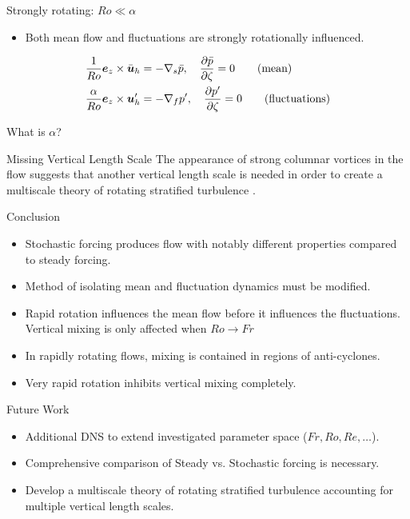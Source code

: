 \documentclass{beamer}
\begin{document}
\begin{frame}{Strongly rotating: $Ro \ll \alpha$}

    \begin{itemize}
        \item Both mean flow and fluctuations are strongly rotationally influenced.
    \end{itemize}

    \begin{align*}
        \frac{1}{Ro}\boldsymbol{e}_z \times \bar{\boldsymbol{u}}_h &= -\nabla_s \bar{p}, \quad \frac{\partial \bar{p}}{\partial \zeta} = 0 \tag{mean}\\
        \frac{\alpha}{Ro}\boldsymbol{e}_z \times \boldsymbol{u}'_h &= -\nabla_f p', \quad \frac{\partial p'}{\partial \zeta} = 0 \tag{fluctuations}
    \end{align*} 

    What is $\alpha$?
\end{frame}

\begin{frame}{Missing Vertical Length Scale}
    The appearance of strong columnar vortices in the flow suggests that another vertical length scale is needed in order to create a multiscale theory of rotating stratified turbulence \citep[cf.][]{SpragueJulienKnoblochWerne2006, JulienKnobloch2007}.
    
\end{frame}

\begin{frame}{Conclusion}

    \begin{itemize}
        \item Stochastic forcing produces flow with notably different properties compared to steady forcing.
        \item Method of isolating mean and fluctuation dynamics must be modified.
        \item Rapid rotation influences the mean flow before it influences the fluctuations. Vertical mixing is only affected when $Ro \to Fr$
        \item In rapidly rotating flows, mixing is contained in regions of anti-cyclones.
        \item Very rapid rotation inhibits vertical mixing completely.
    \end{itemize}

\end{frame}

\begin{frame}{Future Work}
    \begin{itemize}
        \item Additional DNS to extend investigated parameter space ($Fr, Ro, Re, \ldots$).
        \item Comprehensive comparison of Steady vs. Stochastic forcing is necessary.
        \item Develop a multiscale theory of rotating stratified turbulence accounting for multiple vertical length scales.
    \end{itemize}
\end{frame}

{\scriptsize


}
\end{document}

